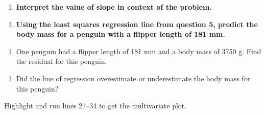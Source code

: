 \documentclass[
]{report}
\providecommand{\tightlist}{%
  \setlength{\itemsep}{0pt}\setlength{\parskip}{0pt}}
\begin{document}
\vspace{.5in}

\begin{enumerate}
\def\labelenumi{\arabic{enumi}.}
\setcounter{enumi}{5}
\tightlist
\item
  \textbf{Interpret the value of slope in context of the problem.}
\end{enumerate}

\vspace{.8in}

\begin{enumerate}
\def\labelenumi{\arabic{enumi}.}
\setcounter{enumi}{6}
\tightlist
\item
  \textbf{Using the least squares regression line from question 5, predict the body mass for a penguin with a flipper length of 181 mm.}
\end{enumerate}

\vspace{.6in}

\begin{enumerate}
\def\labelenumi{\arabic{enumi}.}
\setcounter{enumi}{7}
\tightlist
\item
  One penguin had a flipper length of 181 mm and a body mass of 3750 g. Find the residual for this penguin.
\end{enumerate}

\vspace{.8in}

\begin{enumerate}
\def\labelenumi{\arabic{enumi}.}
\setcounter{enumi}{8}
\tightlist
\item
  Did the line of regression overestimate or underestimate the body mass for this penguin?
\end{enumerate}

\vspace{0.5in}

Highlight and run lines 27--34 to get the multivariate plot.
\end{document}
